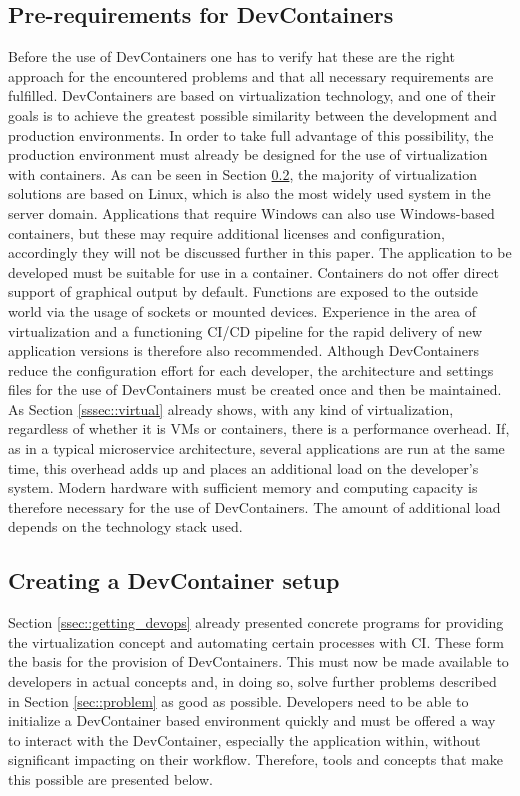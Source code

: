     \subsection{Pre-requirements for DevContainers}
    Before the use of DevContainers one has to verify hat these are the right approach for the encountered problems and that all necessary requirements are fulfilled.\newline
    DevContainers are based on virtualization technology, and one of their goals is to achieve the greatest possible similarity between the development and production environments. In order to take full advantage of this possibility, the production environment must already be designed for the use of virtualization with containers. As can be seen in Section \ref{ssec::toolsused}, the majority of virtualization solutions are based on Linux, which is also the most widely used system in the server domain. Applications that require Windows can also use Windows-based containers, but these may require additional licenses and configuration, accordingly they will not be discussed further in this paper. The application to be developed must be suitable for use in a container. Containers do not offer direct support of graphical output by default. Functions are exposed to the outside world via the usage of sockets or mounted devices. Experience in the area of virtualization and a functioning \ac{CI}/\ac{CD} pipeline for the rapid delivery of new application versions is therefore also recommended.\newline
    Although DevContainers reduce the configuration effort for each developer, the architecture and settings files for the use of DevContainers must be created once and then be maintained. As Section \ref{sssec::virtual} already shows, with any kind of virtualization, regardless of whether it is VMs or containers, there is a performance overhead. If, as in a typical microservice architecture, several applications are run at the same time, this overhead adds up and places an additional load on the developer's system. Modern hardware with sufficient memory and computing capacity is therefore necessary for the use of DevContainers. The amount of additional load depends on the technology stack used.

    \subsection{Creating a DevContainer setup}\label{ssec::toolsused}
    Section \ref{ssec::getting_devops} already presented concrete programs for providing the virtualization concept and automating certain processes with \ac{CI}. These form the basis for the provision of DevContainers. This must now be made available to developers in actual concepts and, in doing so, solve further problems described in Section \ref{sec::problem} as good as possible. Developers need to be able to initialize a DevContainer based environment quickly and must be offered a way to interact with the DevContainer, especially the application within, without significant impacting on their workflow. Therefore, tools and concepts that make this possible are presented below.

